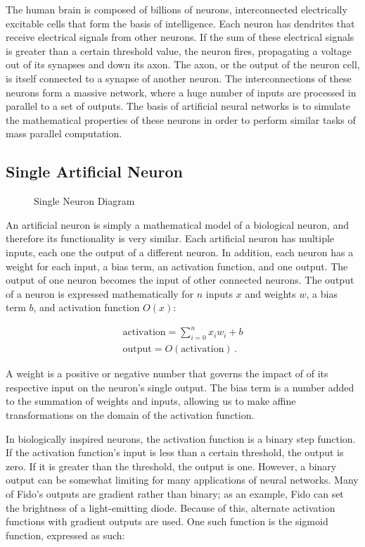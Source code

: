 The human brain is composed of billions of neurons, interconnected electrically excitable cells that form the basis of intelligence. Each neuron has dendrites that receive electrical signals from other neurons. If the sum of these electrical signals is greater than a certain threshold value, the neuron fires, propagating a voltage out of its synapses and down its axon. The axon, or the output of the neuron cell, is itself connected to a synapse of another neuron. The interconnections of these neurons form a massive network, where a huge number of inputs are processed in parallel to a set of outputs. The basis of artificial neural networks is to simulate the mathematical properties of these neurons in order to perform similar tasks of mass parallel computation.


\subsection{Single Artificial Neuron}

\begin{figure}[ht]
	\centering
	
	\caption{Single Neuron Diagram}
\end{figure}

An artificial neuron is simply a mathematical model of a biological neuron, and therefore its functionality is very similar. Each artificial neuron has multiple inputs, each one the output of a different neuron. In addition, each neuron has a weight for each input, a bias term, an activation function, and one output. The output of one neuron becomes the input of other connected neurons. The output of a neuron is expressed mathematically for $n$ inputs $x$ and weights $w$, a bias term $b$, and activation function $O(x)$:

\begin{align*}
	\text{activation} = \sum_{i=0}^{n}x_i w_i + b\\
	\text{output} = O(\text{activation})
	\,.
\end{align*}

A weight is a positive or negative number that governs the impact of of its respective input on the neuron's single output. The bias term is a number added to the summation of weights and inputs, allowing us to make affine transformations on the domain of the activation function. 

In biologically inspired neurons, the activation function is a binary step function. If the activation function's input is less than a certain threshold, the output is zero. If it is greater than the threshold, the output is one. However, a binary output can be somewhat limiting for many applications of neural networks. Many of Fido's outputs are gradient rather than binary; as an example, Fido can set the brightness of a light-emitting diode. Because of this, alternate activation functions with gradient outputs are used. One such function is the sigmoid function, expressed as such:

